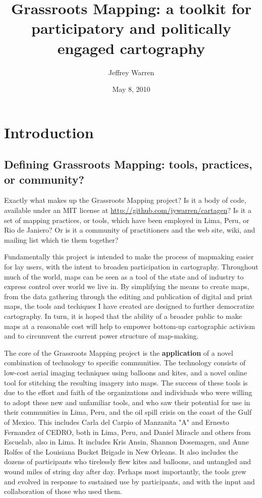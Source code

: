 \documentclass[11pt]{report}
\title{Grassroots Mapping: a toolkit for participatory and politically engaged cartography}
\author{Jeffrey Warren}
\date{May 8, 2010}
\begin{document}
\maketitle

\tableofcontents

\chapter{Introduction}

\section{Defining Grassroots Mapping: tools, practices, or community?}

Exactly what makes up the Grassroots Mapping project? Is it a body of code, available under an MIT license at \url{http://github.com/jywarren/cartagen}? Is it a set of mapping practices, or tools, which have been employed in Lima, Peru, or Rio de Janiero? Or is it a community of practitioners and the web site, wiki, and mailing list which tie them together?

Fundamentally this project is intended to make the process of mapmaking easier for lay users, with the intent to broaden participation in cartography. Throughout much of the world, maps can be seen as a tool of the state and of industry to express control over world we live in. By simplifying the means to create maps, from the data gathering through the editing and publication of digital and print maps, the tools and techiques I have created are designed to further democratize cartography. In turn, it is hoped that the ability of a broader public to make maps at a reasonable cost will help to empower bottom-up cartographic activism and to circumvent the current power structure of map-making. 

The core of the Grassroots Mapping project is the \textbf{application} of a novel combination of technology to specific communities. The technology consists of low-cost aerial imaging techniques using balloons and kites, and a novel online tool for stitching the resulting imagery into maps. The success of these tools is due to the effort and faith of the organizations and individuals who were willing to adopt these new and unfamiliar tools, and who saw their potential for use in their communities in Lima, Peru, and the oil spill crisis on the coast of the Gulf of Mexico. This includes Carla del Carpio of Manzanita "A" and Ernesto Fernandez of CEDRO, both in Lima, Peru, and Daniel Miracle and others from Escuelab, also in Lima. It includes Kris Ansin, Shannon Dosemagen, and Anne Rolfes of the Louisiana Bucket Brigade in New Orleans. It also includes the dozens of participants who tirelessly flew kites and balloons, and untangled and wound miles of string day after day. Perhaps most importantly, the tools grew and evolved in response to sustained use by participants, and with the input and collaboration of those who used them.
\end{document}
